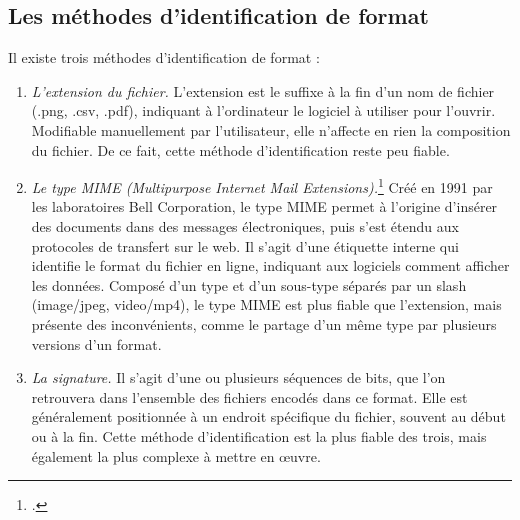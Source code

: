 \subsection*{Les méthodes d'identification de format}
Il existe trois méthodes d'identification de format : 
\begin{enumerate}
    \item\emph{L'extension du fichier.} L'extension est le suffixe à la fin d'un nom de fichier (.png, .csv, .pdf), indiquant à l'ordinateur le logiciel à utiliser pour l'ouvrir. Modifiable manuellement par l'utilisateur, elle n'affecte en rien la composition du fichier. De ce fait, cette méthode d'identification reste peu fiable.
    
    \item\emph{Le type MIME (Multipurpose Internet Mail Extensions).}\footcite{programmevitamIdentificationFormatsFichiers2020} Créé en 1991 par les laboratoires Bell Corporation, le type MIME permet à l'origine d'insérer des documents dans des messages électroniques, puis s'est étendu aux protocoles de transfert sur le web. Il s'agit d'une étiquette interne qui identifie le format du fichier en ligne, indiquant aux logiciels comment afficher les données. Composé d'un type et d'un sous-type séparés par un slash (image/jpeg, video/mp4), le type MIME est plus fiable que l'extension, mais présente des inconvénients, comme le partage d'un même type par plusieurs versions d'un format.
    
    \item\emph{La signature.} Il s’agit d’une ou plusieurs séquences de bits, que l'on retrouvera dans l'ensemble des fichiers encodés dans ce format. Elle est généralement positionnée à un endroit spécifique du fichier, souvent au début ou à la fin. Cette méthode d'identification est la plus fiable des trois, mais également la plus complexe à mettre en \oe{}uvre.
\end{enumerate}


